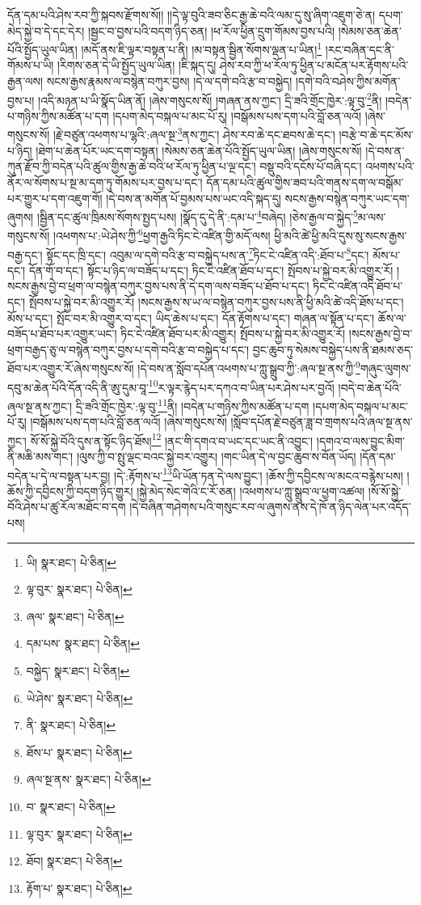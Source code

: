 དོན་དམ་པའི་ཤེས་རབ་ཀྱི་སྐབས་རྫོགས་སོ།། །།དེ་ལྟ་བུའི་ཟབ་ཅིང་རྒྱ་ཆེ་བའི་ལམ་དུ་སུ་ཞིག་འཇུག་ཅེ་ན། དཔག་མེད་སྐྱེ་བ་དེ་དང་དེར། །སྦྱང་བ་བྱས་པའི་བདག་ཉིད་ཅན། །ཕ་རོལ་ཕྱིན་དྲུག་གོམས་བྱས་པའི། །སེམས་ཅན་ཆེན་པོའི་སྤྱོད་ཡུལ་ཡིན། །མདོ་ནས་ཇི་ལྟར་བསྟན་པ་ནི། །མ་བསྟན་སྦྱིན་སོགས་ལྡན་པ་ཡིན།\footnote{ཡི།  སྣར་ཐང་།  པེ་ཅིན། } །རང་བཞིན་དང་ནི་གོམས་པ་ཡི། །རིགས་ཅན་དེ་ཡི་སྤྱོད་ཡུལ་ཡིན། །ཇི་སྐད་དུ། ཤེས་རབ་ཀྱི་ཕ་རོལ་ཏུ་ཕྱིན་པ་མངོན་པར་རྟོགས་པའི་རྒྱན་ལས། སངས་རྒྱས་རྣམས་ལ་བསྙེན་བཀུར་བྱས། །དེ་ལ་དགེ་བའི་རྩ་བ་བསྐྱེད། །དགེ་བའི་བཤེས་ཀྱིས་མགོན་བྱས་པ། །འདི་མཉན་པ་ཡི་སྣོད་ཡིན་ནོ། །ཞེས་གསུངས་སོ། །གཞན་ནས་ཀྱང་། དྲི་ཟའི་གྲོང་ཁྱེར་:ལྟ་བུ་\footnote{ལྟ་བུར་  སྣར་ཐང་།  པེ་ཅིན། }ནི། །བདེན་པ་གཉིས་ཀྱིས་མཚོན་པ་དག །དཔག་མེད་བསྐལ་པ་མང་པོ་རུ། །བསྒོམས་པས་དག་པའི་བློ་ཅན་ལའོ། །ཞེས་གསུངས་སོ། །རྗེ་བཙུན་འཕགས་པ་ལྷའི་:ཞལ་སྔ་\footnote{ཞལ་  སྣར་ཐང་།  པེ་ཅིན། }ནས་ཀྱང་། ཤེས་རབ་ཆེ་དང་ཐབས་ཆེ་དང་། །བརྩེ་བ་ཆེ་དང་མོས་པ་ཉིད། །ཐེག་པ་ཆེན་པོར་ཡང་དག་བསྟན། །སེམས་ཅན་ཆེན་པོའི་སྤྱོད་ཡུལ་ཡིན། །ཞེས་གསུངས་སོ། །དེ་བས་ན་ཀུན་རྫོབ་ཀྱི་བདེན་པའི་ཚུལ་གྱིས་རྒྱ་ཆེ་བའི་ཕ་རོལ་ཏུ་ཕྱིན་པ་ལྔ་དང་། བསྡུ་བའི་དངོས་པོ་བཞི་དང་། འཕགས་པའི་ནོར་ལ་སོགས་པ་སྔ་མ་དག་ཏུ་གོམས་པར་བྱས་པ་དང་། དོན་དམ་པའི་ཚུལ་གྱིས་ཟབ་པའི་གནས་དག་ལ་བསྒོམ་པར་གྱུར་པ་དག་འཇུག་གོ། །དེ་བས་ན་མགོན་པོ་བྱམས་པས་ཡང་འདི་སྐད་དུ། སངས་རྒྱས་བསྙེན་བཀུར་ཡང་དག་ཞུགས། །སྦྱིན་དང་ཚུལ་ཁྲིམས་སོགས་སྤྱད་པས། །སྣོད་དུ་དེ་ནི་:དམ་པ་\footnote{དམ་པས་  སྣར་ཐང་།  པེ་ཅིན། }བཞེད། །ཅེས་རྒྱལ་བ་སྐྱེད་\footnote{བསྐྱེད་  སྣར་ཐང་།  པེ་ཅིན། }མ་ལས་གསུངས་སོ། །འཕགས་པ་:ཡེ་ཤེས་ཀྱི་\footnote{ཡེ་ཤེས་  སྣར་ཐང་།  པེ་ཅིན། }ཕྱག་རྒྱའི་ཏིང་ངེ་འཛིན་གྱི་མདོ་ལས། ཕྱི་མའི་ཚེ་ཕྱི་མའི་དུས་སུ་སངས་རྒྱས་བརྒྱ་དང་། སྟོང་དང་ཁྲི་དང་། འབུམ་ལ་དགེ་བའི་རྩ་བ་བསྐྱེད་པས་ན་\footnote{ནི་  སྣར་ཐང་།  པེ་ཅིན། }ཏིང་ངེ་འཛིན་འདི་:ཐོབ་པ་\footnote{ཐོས་པ་  སྣར་ཐང་།  པེ་ཅིན། }དང་། མོས་པ་དང་། དོན་གོ་བ་དང་། སྟོང་པ་ཉིད་ལ་བཟོད་པ་དང་། ཏིང་ངེ་འཛིན་ཐོབ་པ་དང་། སྤོབས་པ་སྐྱེ་བར་མི་འགྱུར་རོ། །སངས་རྒྱས་བྱེ་བ་ཕྲག་ལ་བསྙེན་བཀུར་བྱས་པས་ནི་དེ་དག་ལས་བཟོད་པ་ཐོབ་པ་དང་། ཏིང་ངེ་འཛིན་འདི་ཐོབ་པ་དང་། སྤོབས་པ་སྐྱེ་བར་མི་འགྱུར་རོ། །སངས་རྒྱས་ས་ཡ་ལ་བསྙེན་བཀུར་བྱས་པས་ནི་ཕྱི་མའི་ཚེ་འདི་ཐོས་པ་དང་། མོས་པ་དང་། སྤོང་བར་མི་འགྱུར་བ་དང་། ཡིད་ཆེས་པ་དང་། དོན་རྟོགས་པ་དང་། གཞན་ལ་སྟོན་པ་དང་། ཆོས་ལ་བཟོད་པ་ཐོབ་པར་འགྱུར་ཡང་། ཏིང་ངེ་འཛིན་ཐོབ་པར་མི་འགྱུར། སྤོབས་པ་སྐྱེ་བར་མི་འགྱུར་རོ། །སངས་རྒྱས་བྱེ་བ་ཕྲག་བརྒྱད་ཅུ་ལ་བསྙེན་བཀུར་བྱས་པ་དགེ་བའི་རྩ་བ་བསྐྱེད་པ་དང་། བྱང་ཆུབ་ཏུ་སེམས་བསྐྱེད་པས་ནི་ཐམས་ཅད་ཐོབ་པར་འགྱུར་རོ་ཞེས་གསུངས་སོ། །དེ་བས་ན་སློབ་དཔོན་འཕགས་པ་ཀླུ་སྒྲུབ་ཀྱི་:ཞལ་སྔ་ནས་ཀྱི་\footnote{ཞལ་སྔ་ནས་  སྣར་ཐང་།  པེ་ཅིན། }གཞུང་ལུགས་དབུ་མ་ཆེན་པོའི་དོན་འདི་ནི་ཨུ་དུམ་བཱ་\footnote{བ་  སྣར་ཐང་།  པེ་ཅིན། }ར་ལྟར་རྙེད་པར་དཀའ་བ་ཡིན་པར་ཤེས་པར་བྱའོ། །བདེ་བ་ཆེན་པོའི་ཞལ་སྔ་ནས་ཀྱང་། དྲི་ཟའི་གྲོང་ཁྱེར་:ལྟ་བུ་\footnote{ལྟ་བུར་  སྣར་ཐང་།  པེ་ཅིན། }ནི། །བདེན་པ་གཉིས་ཀྱིས་མཚོན་པ་དག །དཔག་མེད་བསྐལ་པ་མང་པོ་རུ། །བསྒོམས་པས་དག་པའི་བློ་ཅན་ལའོ། །ཞེས་གསུངས་སོ། །སློབ་དཔོན་རྗེ་བཙུན་ཟླ་བ་གྲགས་པའི་ཞལ་སྔ་ནས་ཀྱང་། སོ་སོ་སྐྱེ་བོའི་དུས་ན་སྟོང་ཉིད་ཐོས།\footnote{ཐོབ།  སྣར་ཐང་།  པེ་ཅིན། } །ནང་གི་དགའ་བ་ཡང་དང་ཡང་ནི་འབྱུང་། །དགའ་བ་ལས་བྱུང་མིག་ནི་མཆི་མས་གང་། །ལུས་ཀྱི་བ་སྤུ་ལྡང་བའང་སྐྱེ་བར་འགྱུར། །གང་ཡིན་དེ་ལ་བྱང་ཆུབ་ས་བོན་ཡོད། །དོན་དམ་བདེན་པ་དེ་ལ་བསྟན་པར་བྱ། །དེ་:རྟོགས་པ་\footnote{རྟོག་པ་  སྣར་ཐང་།  པེ་ཅིན། }ཡི་ཡོན་ཏན་དེ་ལས་བྱུང་། །ཆོས་ཀྱི་དབྱིངས་ལ་མངའ་བརྙེས་པས། །ཆོས་ཀྱི་དབྱིངས་ཀྱི་བདག་ཉིད་གྱུར། །སྐྱེ་མེད་སེང་གེའི་ང་རོ་ཅན། །འཕགས་པ་ཀླུ་སྒྲུབ་ལ་ཕྱག་འཚལ། །སོ་སོ་སྐྱེ་བོའི་ཤེས་པ་ཚུ་རོལ་མཐོང་བ་དག །དེ་བཞིན་གཤེགས་པའི་གསུང་རབ་ལ་ཞུགས་ནས་དེ་ཁོ་ན་ཉིད་ལེན་པར་འདོད་པས། 